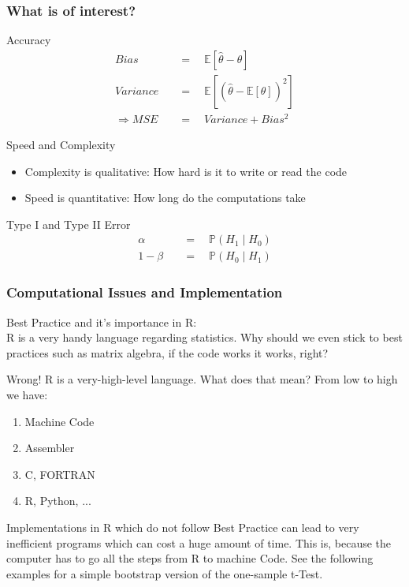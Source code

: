 \documentclass[9pt, dvipsnames]{beamer} %
\begin{document}
    \begin{frame}
    	\frametitle{\textbf{What is of interest?}}
    	\begin{block}{Accuracy}
    		\begin{align*}
    			Bias \quad &= \quad \mathbb{E}[\hat{\theta} - \theta]\\
    			Variance \quad &= \quad \mathbb{E}\left[(\hat{\theta} - \mathbb{E}[\theta])^2\right] \\
    			\Rightarrow MSE \quad &= \quad Variance + Bias^2
    		\end{align*}
    	\end{block}
    	\begin{block}{Speed and Complexity}
    		\begin{itemize}
    			\item Complexity is qualitative: How hard is it to write or read the code
    			\item Speed is quantitative: How long do the computations take
    		\end{itemize}
    	\end{block}
    	\begin{block}{Type I and Type II Error}
    		\begin{align*}
    			\alpha \quad &= \quad \mathbb{P}(H_1 \mid H_0) \\
    			1 - \beta \quad &= \quad \mathbb{P}(H_0 \mid H_1)
    		\end{align*}
    	\end{block}
    \end{frame}
    \begin{frame}
    	\frametitle{\textbf{Computational Issues and Implementation}}
    		Best Practice and it's importance in R:\\
    		R is a very handy language regarding statistics. Why should we even stick to best practices such as matrix algebra, if the code works it works, right?
    		\begin{alertblock}{Wrong!}
    			R is a very-high-level language. What does that mean? From low to high we have:
    			\begin{enumerate}
    				\item Machine Code
    				\item Assembler
    				\item C, FORTRAN
    				\item R, Python, ...
    			\end{enumerate}
    			Implementations in R which do not follow Best Practice can lead to very inefficient programs which can cost a huge amount of time. This is, because the computer has to go all the steps from R to machine Code. See the following examples for a simple bootstrap version of the one-sample t-Test.
    		\end{alertblock}
    \end{frame}
\end{document}
